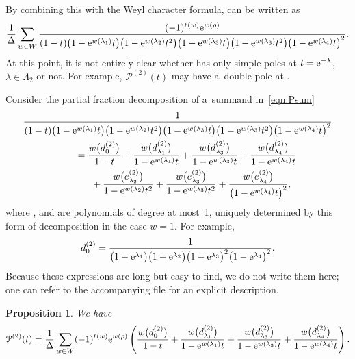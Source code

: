 \documentclass[pdftex]{sigma}
\numberwithin{equation}{section}
\newtheorem{Proposition}[Theorem]{Proposition}
\theoremstyle{definition}
\newcommand{\K}{\mathbb{K}}
\newcommand\La{\Lambda}
\newcommand\la{\lambda}
\begin{document}
By combining this with the Weyl character formula,  can be written as
\begin{equation}\label{eqn:Psum}
\frac{1}{\Delta}\sum_{w\in W} \frac{(-1)^{\ell(w)}{\rm e}^{w(\rho)}}{(1-t)\bigl(1-{\rm e}^{w(\la _1)}t\bigr)\bigl(1-{\rm e}^{w(\la _2)}t^2\bigr)\bigl(1-{\rm e}^{w(\la_3)}t\bigr)\bigl(1-{\rm e}^{w(\la _3)}t^2\bigr)\bigl(1-{\rm e}^{w(\la _4)}t\bigr)^2}.
\end{equation}
At this point, it is not entirely clear whether  has only simple poles at $t={\rm e}^{-\la}$, $\la\in \La_2$ or not. For example, $\mathcal{P}^{(2)}(t)$ may have a~double pole at \smash{$t={\rm e}^{-w(\la_4)}$}.

Consider the partial fraction decomposition of a~summand in~\eqref{eqn:Psum}
\begin{gather*}
\frac{1}{(1-t)\bigl(1-{\rm e}^{w(\la _1)}t\bigr)\bigl(1-{\rm e}^{w(\la _2)}t^2\bigr)\bigl(1-{\rm e}^{w(\la_3)}t\bigr)\bigl(1-{\rm e}^{w(\la _3)}t^2\bigr)\bigl(1-{\rm e}^{w(\la _4)}t\bigr)^2} \\
\qquad=
\frac{w\bigl(d^{(2)}_{0}\bigr)}{1-t}
+\frac{w\bigl(d^{(2)}_{\la_1}\bigr)}{1-{\rm e}^{w(\la_1)}t}
+\frac{w\bigl(d^{(2)}_{\la_3}\bigr)}{1-{\rm e}^{w(\la_3)}t}
+\frac{w\bigl(d^{(2)}_{\la_4}\bigr)}{1-{\rm e}^{w(\la_4)}t} \\
\phantom{\qquad=}{}
+\frac{w\bigl(e^{(2)}_{\la_2}\bigr)}{1-{\rm e}^{w(\la_2)}t^2}
+\frac{w\bigl(e^{(2)}_{\la_3}\bigr)}{1-{\rm e}^{w(\la_3)}t^2}
+\frac{w\bigl(e^{(2)}_{\la_4}\bigr)}{\bigl(1-{\rm e}^{w(\la_4)}t\bigr)^2},
\end{gather*}
where \smash{$d^{(2)}_{\la}, e^{(2)}_{\la_4}\in \K$}, and \smash{$e^{(2)}_{\la_2},e^{(2)}_{\la_3}\in \K[t]$} are polynomials of degree at most~1, uniquely determined by this form of decomposition in the case $w=1$.
For example,
\begin{equation}\label{Dtwozero}
d^{(2)}_{0}=
\frac{1}{\bigl(1-{\rm e}^{\la _1}\bigr) \bigl(1-{\rm e}^{\la _2}\bigr) \bigl(1-{\rm e}^{\la _3}\bigr)^2 \bigl(1-{\rm e}^{\la _4}\bigr)^2}.
\end{equation}
Because these expressions are long but easy to find, we do not write them here; one can refer to the accompanying file for an explicit description.
\begin{Proposition}\label{prop:pfd}
We have
\[
\mathcal{P}^{(2)}(t) =
\frac{1}{\Delta}\sum_{w\in W}(-1)^{\ell(w)}{\rm e}^{w(\rho)}
\left(
\frac{w\bigl(d^{(2)}_{0}\bigr)}{1-t}
+\frac{w\bigl(d^{(2)}_{\la_1}\bigr)}{1-{\rm e}^{w(\la _1)}t}
+\frac{w\bigl(d^{(2)}_{\la_3}\bigr)}{1-{\rm e}^{w(\la _3)}t}
+\frac{w\bigl(d^{(2)}_{\la_4}\bigr)}{1-{\rm e}^{w(\la _4)}t}
\right).
\]
\end{Proposition}
\end{document}
